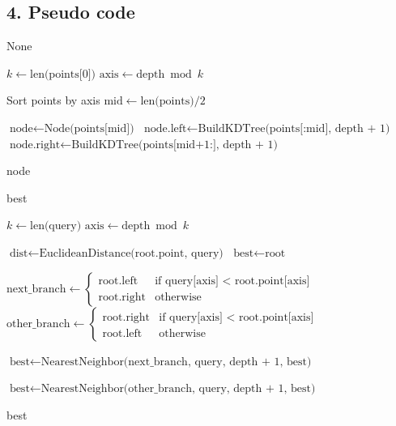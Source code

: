 \subsection{4. Pseudo code}
\begin{algorithm}
\begin{algorithmic}[1]
\label{alg:kd_build}
        \State \Return None
    \EndIf
    
    \State $k \gets \text{len(points[0])}$
    \State $\text{axis} \gets \text{depth} \bmod k$
    
    \State Sort points by axis
    \State $\text{mid} \gets \text{len(points)} / 2$
    
    \State $\text{node} \gets \text{Node(points[mid])}$
    \State $\text{node.left} \gets \text{BuildKDTree(points[:mid], depth + 1)}$
    \State $\text{node.right} \gets \text{BuildKDTree(points[mid+1:], depth + 1)}$
    
    \State \Return node
\EndFunction

\label{alg:kd_nn}
        \State \Return best
    \EndIf
    
    \State $k \gets \text{len(query)}$
    \State $\text{axis} \gets \text{depth} \bmod k$
    
    \State $\text{dist} \gets \text{EuclideanDistance(root.point, query)}$
        \State $\text{best} \gets \text{root}$
    \EndIf
        
    \State $\text{next\_branch} \gets \begin{cases} \text{root.left} & \text{if query[axis] < root.point[axis]} \\ \text{root.right} & \text{otherwise} \end{cases}$
    \State $\text{other\_branch} \gets \begin{cases} \text{root.right} & \text{if query[axis] < root.point[axis]} \\ \text{root.left} & \text{otherwise} \end{cases}$
    
    \State $\text{best} \gets \text{NearestNeighbor(next\_branch, query, depth + 1, best)}$
    
        \State $\text{best} \gets \text{NearestNeighbor(other\_branch, query, depth + 1, best)}$
    \EndIf
        
    \State \Return best
\EndFunction
\end{algorithmic}
\end{algorithm}

